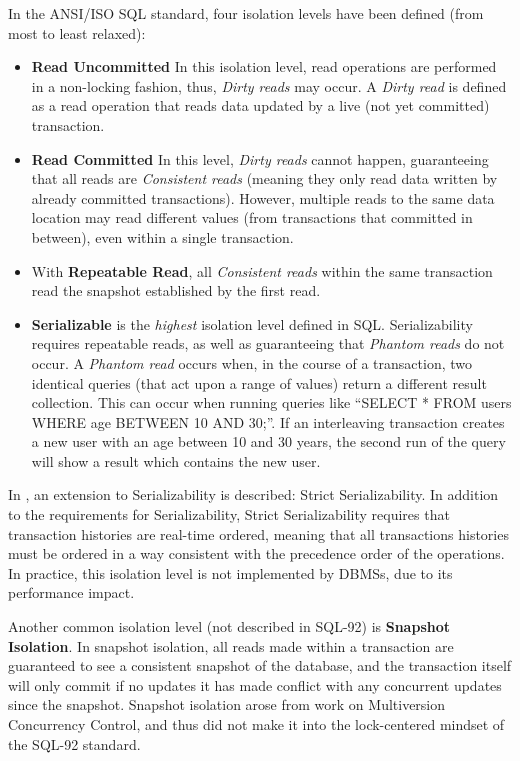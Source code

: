 \documentclass{llncs}
\begin{document}
In the ANSI/ISO SQL standard\cite{melton1992ansi}, four isolation
levels have been defined (from most to least relaxed):

\begin{itemize}
\item {\bf Read Uncommitted} In this isolation level, read operations
  are performed in a non-locking fashion, thus, {\it Dirty reads} may
  occur. A {\it Dirty read} is defined as a read operation that reads
  data updated by a live (not yet committed) transaction.
\item {\bf Read Committed} In this level, {\it Dirty reads} cannot
  happen, guaranteeing that all reads are {\it Consistent reads}
  (meaning they only read data written by already committed
  transactions). However, multiple reads to the same data location may
  read different values (from transactions that committed in between),
  even within a single transaction.
\item With {\bf Repeatable Read}, all {\it Consistent reads} within
  the same transaction read the snapshot established by the first
  read.
\item {\bf Serializable} is the {\it highest} isolation level defined
  in SQL. Serializability requires repeatable reads, as well as
  guaranteeing that {\it Phantom reads} do not occur. A {\it Phantom
    read} occurs when, in the course of a transaction, two identical
  queries (that act upon a range of values) return a different result
  collection. This can occur when running queries like ``SELECT * FROM
  users WHERE age BETWEEN 10 AND 30;''. If an interleaving transaction
  creates a new user with an age between 10 and 30 years, the second
  run of the query will show a result which contains the new user.
\end{itemize}

In \cite{papadimitriou1979serializability}, an extension to
Serializability is described: Strict Serializability. In addition to
the requirements for Serializability, Strict Serializability requires
that transaction histories are real-time ordered, meaning that all
transactions histories must be ordered in a way consistent with the
precedence order of the operations. In practice, this isolation level
is not implemented by DBMSs, due to its performance impact.

Another common isolation level (not described in SQL-92) is {\bf
  Snapshot Isolation}. In snapshot isolation, all reads made within a
transaction are guaranteed to see a consistent snapshot of the
database, and the transaction itself will only commit if no updates it
has made conflict with any concurrent updates since the
snapshot. Snapshot isolation arose from work on Multiversion
Concurrency Control, and thus did not make it into the lock-centered
mindset of the SQL-92 standard.
\end{document}
